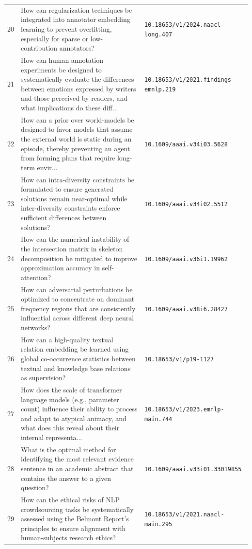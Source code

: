 \documentclass[runningheads]{llncs}
\begin{document}
\begin{longtable}{@{}p{0.5cm}p{7.2cm}p{2.5cm}@{}}
20 & How can regularization techniques be integrated into annotator embedding learning to prevent overfitting, especially for sparse or low-contribution annotators? & \texttt{10.18653/v1/2024.naacl-long.407} \\
21 & How can human annotation experiments be designed to systematically evaluate the differences between emotions expressed by writers and those perceived by readers, and what implications do these diff... & \texttt{10.18653/v1/2021.findings-emnlp.219} \\
22 & How can a prior over world-models be designed to favor models that assume the external world is static during an episode, thereby preventing an agent from forming plans that require long-term envir... & \texttt{10.1609/aaai.v34i03.5628} \\
23 & How can intra-diversity constraints be formulated to ensure generated solutions remain near-optimal while inter-diversity constraints enforce sufficient differences between solutions? & \texttt{10.1609/aaai.v34i02.5512} \\
24 & How can the numerical instability of the intersection matrix in skeleton decomposition be mitigated to improve approximation accuracy in self-attention? & \texttt{10.1609/aaai.v36i1.19962} \\
25 & How can adversarial perturbations be optimized to concentrate on dominant frequency regions that are consistently influential across different deep neural networks? & \texttt{10.1609/aaai.v38i6.28427} \\
26 & How can a high-quality textual relation embedding be learned using global co-occurrence statistics between textual and knowledge base relations as supervision? & \texttt{10.18653/v1/p19-1127} \\
27 & How does the scale of transformer language models (e.g., parameter count) influence their ability to process and adapt to atypical animacy, and what does this reveal about their internal representa... & \texttt{10.18653/v1/2023.emnlp-main.744} \\
28 & What is the optimal method for identifying the most relevant evidence sentence in an academic abstract that contains the answer to a given question? & \texttt{10.1609/aaai.v33i01.33019855} \\
29 & How can the ethical risks of NLP crowdsourcing tasks be systematically assessed using the Belmont Report's principles to ensure alignment with human-subjects research ethics? & \texttt{10.18653/v1/2021.naacl-main.295} \\

\end{longtable}
\end{document}

